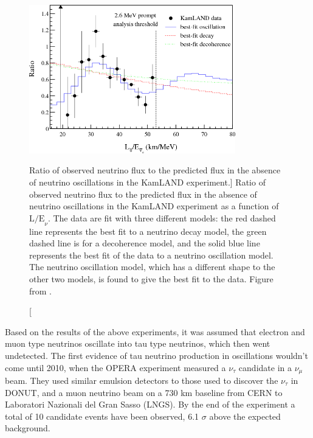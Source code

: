 \begin{figure}

	\centering

	\includegraphics[width=0.8\textwidth]{figures/kamland_spec.png}

	\caption
	[Ratio of observed neutrino flux to the predicted flux in the absence of
	neutrino oscillations in the KamLAND experiment.]
	{Ratio of observed neutrino flux to the predicted flux in the absence of
	neutrino oscillations in the KamLAND experiment as a function of 
	\(\mbox{L/E}_\nu\). The data are fit with three different models: the red 
	dashed line represents the best fit to a neutrino decay model, the green 
	dashed line is for a decoherence model, and the solid blue line represents the 
	best fit of the data to a neutrino oscillation model. The neutrino oscillation
	model, which has a different shape to the other two models, is found to give 
	the best fit to the data. Figure from \cite{Araki2005}.} 

	\label{fig:kamland_spectrum}

\end{figure}

Based on the results of the above experiments, it was assumed that electron and
muon type neutrinos oscillate into tau type neutrinos, which then
went undetected. The first evidence of tau neutrino production in oscillations
wouldn't come until 2010, when the OPERA experiment measured a \(\nu_\tau\) 
candidate in a \(\nu_\mu\) beam. They used similar emulsion detectors to those 
used to discover the \(\nu_\tau\) in DONUT, and a muon neutrino beam on a 730 km 
baseline from CERN to Laboratori Nazionali del Gran Sasso (LNGS). By the end 
of the experiment a total of 10 candidate events have been observed, 6.1 
\(\sigma\) above the expected background\cite{Agafonova2010, Agafonova2018}.

